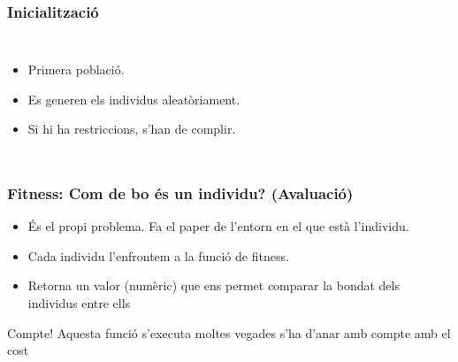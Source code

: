 \documentclass{beamer}
\begin{document}
\begin{frame}
	\frametitle{Inicialització}
	\begin{columns}[c]
		\begin{itemize}
			\item Primera població.
			\item Es generen els individus aleatòriament.
			\item Si hi ha restriccions, s'han de complir.
		\end{itemize}
	\end{columns}
\end{frame}

\begin{frame}
	\frametitle{Fitness: Com de bo és un individu? (Avaluació)} 
	\begin{itemize}
		\item És el propi problema.  Fa el paper de l'entorn en el que està
		l'individu.
		\item Cada individu l'enfrontem a la funció de fitness.
		\item Retorna un valor (numèric) que ens permet comparar la bondat dels
		individus entre ells
	\end{itemize}
	\pause
	\begin{alertblock}{Compte!}
		Aquesta funció s'executa moltes vegades s'ha d'anar amb compte amb el
		cost
	\end{alertblock}
\end{frame}
\end{document}
